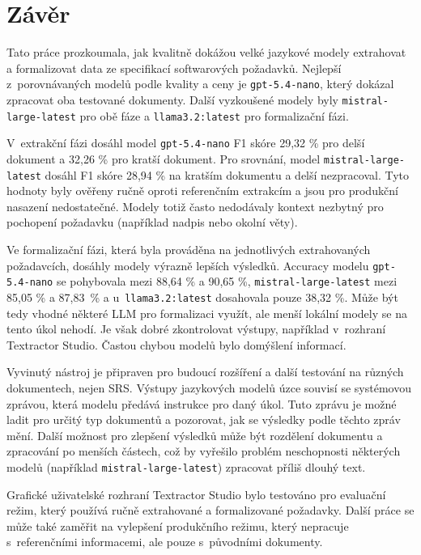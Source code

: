\documentclass[czech, bc, kiv, he, iso690numb, pdf]{fasthesis}
\begin{document}
\chapter{Závěr}
Tato práce prozkoumala, jak kvalitně dokážou velké jazykové modely extrahovat a formalizovat data ze specifikací softwarových požadavků. Nejlepší z~porovnávaných modelů podle kvality a ceny je \verb"gpt-5.4-nano", který dokázal zpracovat oba testované dokumenty. Další vyzkoušené modely byly \verb"mistral-large-latest" pro obě fáze a \verb"llama3.2:latest" pro formalizační fázi. 

V~extrakční fázi dosáhl model \verb"gpt-5.4-nano" F1 skóre 29,32 \% pro delší dokument a 32,26 \% pro kratší dokument. Pro srovnání, model \verb"mistral-large-latest" dosáhl F1 skóre 28,94 \% na kratším dokumentu a delší nezpracoval. Tyto hodnoty byly ověřeny ručně oproti referenčním extrakcím a jsou pro produkční nasazení nedostatečné. Modely totiž často nedodávaly kontext nezbytný pro pochopení požadavku (například nadpis nebo okolní věty).

Ve formalizační fázi, která byla prováděna na jednotlivých extrahovaných požadavcích, dosáhly modely výrazně lepších výsledků. Accuracy modelu \verb"gpt-5.4-nano" se pohybovala mezi 88,64 \% a 90,65 \%, \verb"mistral-large-latest" mezi 85,05 \% a 87,83~\% a u~\verb"llama3.2:latest" dosahovala pouze 38,32 \%. Může být tedy vhodné některé LLM pro formalizaci využít, ale menší lokální modely se na tento úkol nehodí. Je však dobré zkontrolovat výstupy, například v~rozhraní Textractor Studio. Častou chybou modelů bylo domýšlení informací.

Vyvinutý nástroj je připraven pro budoucí rozšíření a další testování na různých dokumentech, nejen SRS. Výstupy jazykových modelů úzce souvisí se systémovou zprávou, která modelu předává instrukce pro daný úkol. Tuto zprávu je možné ladit pro určitý typ dokumentů a pozorovat, jak se výsledky podle těchto zpráv mění. Další možnost pro zlepšení výsledků může být rozdělení dokumentu a zpracování po menších částech, což by vyřešilo problém neschopnosti některých modelů (například \verb"mistral-large-latest") zpracovat příliš dlouhý text.

Grafické uživatelské rozhraní Textractor Studio bylo testováno pro evaluační režim, který používá ručně extrahované a formalizované požadavky. Další práce se může také zaměřit na vylepšení produkčního režimu, který nepracuje s~referenčními informacemi, ale pouze s~původními dokumenty.


\listoffigures
\listoftables
\listoflistings
\end{document}
